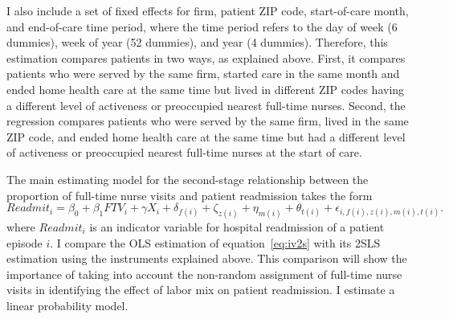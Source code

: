 \documentclass[final,12pt]{article}
\begin{document}
I also include a set of fixed effects for firm, patient ZIP code, start-of-care month, and end-of-care time period, where the time period refers to the day of week (6 dummies), week of year (52 dummies), and year (4 dummies).
 Therefore, this estimation compares patients in two ways, as explained above.
First, it compares patients who were served by the same firm, started care in the same month and ended home health care at the same time but lived in different ZIP codes having a different level of activeness or preoccupied nearest full-time nurses.
Second, the regression compares
patients who were served by the same firm, lived in the same ZIP code, and ended home health care at the same time but had a different level of activeness or preoccupied nearest full-time nurses at the start of care.

The main estimating model for the second-stage relationship between the proportion of full-time nurse visits and patient readmission takes the form
\begin{equation} \label{eq:iv2s}
Readmit_i = \beta_0 + \beta_1 FTV_i + \gamma X_i + \delta_{f(i)} + \zeta_{z(i)} + \eta_{m(i)} + \theta_{t(i)} + \epsilon_{i, f(i), z(i), m(i), t(i)}.
\end{equation}
where $Readmit_i$ is an indicator variable for hospital readmission of a patient episode $i$. I compare the OLS estimation of equation~\ref{eq:iv2s} with its 2SLS estimation using the instruments explained above.
This comparison will show the importance of taking into account the non-random assignment of full-time nurse visits in identifying the effect of labor mix on patient readmission.
 I estimate a linear probability model.

\end{document}
